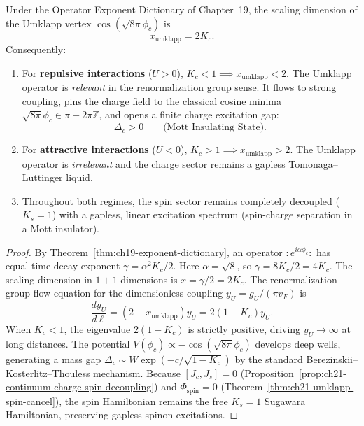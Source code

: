 \begin{theorem}
\label{thm:ch21-scaling-dimension-mott}
Under the Operator Exponent Dictionary of Chapter~19, the scaling dimension of the Umklapp
vertex $\cos(\sqrt{8\pi}\phi_c)$ is
\begin{equation}
 x_{\mathrm{umklapp}} = 2 K_c.
 \label{eq:ch21-umklapp-scaling-dim}
\end{equation}
Consequently:
\begin{enumerate}
 \item For \textbf{repulsive interactions} ($U > 0$), $K_c < 1 \implies x_{\mathrm{umklapp}} < 2$.
       The Umklapp operator is \emph{relevant} in the renormalization group sense.
       It flows to strong coupling, pins the charge field to the classical cosine minima
       $\sqrt{8\pi}\phi_c \in \pi + 2\pi\mathbb Z$, and opens a finite charge excitation gap:
       \begin{equation}
        \Delta_c > 0 \qquad \text{(Mott Insulating State)}.
        \label{eq:ch21-mott-gap}
       \end{equation}
 \item For \textbf{attractive interactions} ($U < 0$), $K_c > 1 \implies x_{\mathrm{umklapp}} > 2$.
       The Umklapp operator is \emph{irrelevant} and the charge sector remains a gapless Tomonaga--Luttinger liquid.
 \item Throughout both regimes, the spin sector remains completely decoupled ($K_s = 1$)
       with a gapless, linear excitation spectrum (spin-charge separation in a Mott insulator).
\end{enumerate}
\end{theorem}
\begin{proof}
By Theorem~\ref{thm:ch19-exponent-dictionary}, an operator $:\!e^{i\alpha\phi_c}\!:$ has equal-time decay exponent
$\gamma = \alpha^2 K_c / 2$.  Here $\alpha = \sqrt{8}$, so $\gamma = 8 K_c / 2 = 4 K_c$.
The scaling dimension in $1+1$ dimensions is $x = \gamma / 2 = 2 K_c$.
The renormalization group flow equation for the dimensionless coupling $y_U = g_U / (\pi v_F)$ is
\begin{equation}
 \frac{d y_U}{d\ell} = (2 - x_{\mathrm{umklapp}}) y_U = 2(1 - K_c) y_U.
 \label{eq:ch21-bkt-flow}
\end{equation}
When $K_c < 1$, the eigenvalue $2(1-K_c)$ is strictly positive, driving $y_U \to \infty$ at long distances.
The potential $V(\phi_c) \propto - \cos(\sqrt{8\pi}\phi_c)$ develops deep wells, generating a mass gap
$\Delta_c \sim W \exp(-c / \sqrt{1 - K_c})$ by the standard Berezinskii--Kosterlitz--Thouless mechanism.
Because $[J_c, J_s] = 0$ (Proposition~\ref{prop:ch21-continuum-charge-spin-decoupling}) and
$\Phi_{\mathrm{spin}} = 0$ (Theorem~\ref{thm:ch21-umklapp-spin-cancel}), the spin Hamiltonian
remains the free $K_s = 1$ Sugawara Hamiltonian, preserving gapless spinon excitations.
\end{proof}

